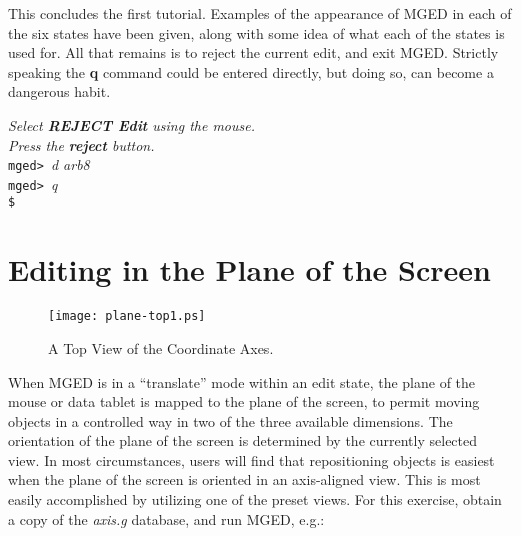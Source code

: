 This concludes the first tutorial.  Examples of the appearance of MGED
in each of the six states have been given, along with some idea of what
each of the states is used for.  All that remains is to reject the current
edit, and exit MGED.  Strictly speaking the {\bf q} command could be entered
directly, but doing so, can become a dangerous habit.

\noindent
{\em Select {\bf REJECT Edit} using the mouse.}\\
{\em Press the {\bf reject} button.}\\
{\tt mged> }{\em d arb8}\\
{\tt mged> }{\em q}\\
{\tt \$ }\\

\section{Editing in the Plane of the Screen}
\begin{figure}
\centering \texttt{[image: plane-top1.ps]}
\caption{A Top View of the Coordinate Axes.}
\label{plane-top1}
\end{figure}

When MGED is in a ``translate'' mode within an edit state,
the plane of the mouse or data tablet is mapped to
the plane of the screen, to permit moving objects in a
controlled way in two of the three available dimensions.
The orientation of the plane of the screen is determined by the
currently selected view.
In most circumstances, users will find that repositioning objects
is easiest when the plane of the screen is oriented in an
axis-aligned view.  This is most easily accomplished by utilizing
one of the preset views.
For this exercise, obtain a copy of the {\em axis.g} database,
and run MGED, e.g.:


